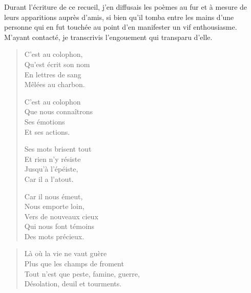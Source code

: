 \begin{prose}
  Durant l’écriture de ce recueil, j’en diffusais les poèmes au fur et à mesure de leurs apparitions auprès d’amis, si bien qu’il tomba entre les mains d’une personne qui en fut touchée au point d’en manifester un vif enthousiasme.
  M’ayant contacté, je transcrivis l’engouement qui transparu d’elle.
\end{prose}


\begin{verse}%
  \quatrain%
  C’est au colophon,\\  %
  Qu’est écrit son nom\\  %
  En lettres de sang\\  %
  Mêlées au charbon.

  C’est au colophon\\  %
  Que nous connaîtrons\\  %
  Ses émotions\\  %
  Et ses actions.

  Ses mots brisent tout\\  %
  Et rien n’y résiste\\  %
  Jusqu’à l’épéiste,\\  %
  Car il a l’atout.

  Car il nous émeut,\\  %
  Nous emporte loin,\\  %
  Vers de nouveaux cieux\\  %
  Qui nous font témoins\\  %
  Des mots précieux.
\end{verse}


\begin{verse}%
  \quatrain%
  Là où la vie ne vaut guère\\  %
  Plus que les champs de froment\\  %
  Tout n’est que peste, famine, guerre,\\  %
  Désolation, deuil et tourments.
\end{verse}

